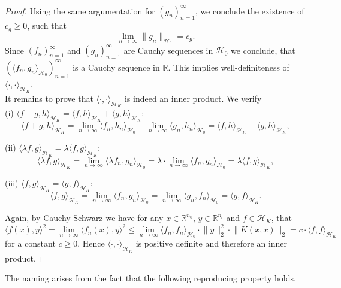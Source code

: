 \documentclass[11pt, a4paper]{article}
\newcommand{\N}{\mathbb{N}}
\newcommand{\R}{\mathbb{R}}
\renewcommand{\H}{\mathcal{H}}
\begin{document}
\begin{proof}
Using the same argumentation for $(g_n)_{n=1}^\infty$, we conclude the existence of $c_g \geq 0$, such that 
\[ \lim_{n \to \infty} \| g_n \big \|_{\H_0} = c_g. \] 
Since $(f_n)_{n=1}^\infty$ and $(g_n)_{n=1}^\infty$ are Cauchy sequences in $\H_0$ we conclude, that $(\langle f_n, g_n \rangle_{\H_0})_{n=1}^\infty$ is a Cauchy sequence in $\R$. This implies well-definiteness of $\langle \cdot, \cdot \rangle_{\H_K}$. \\

It remains to prove that $\langle \cdot, \cdot \rangle_{\H_K}$ is indeed an inner product. We verify \\

(i) $\langle f + g , h \rangle_{\H_K} = \langle f , h \rangle_{\H_K} + \langle g , h \rangle_{\H_K}$:
\[ \langle f + g , h \rangle_{\H_K} = \lim_{n \to \infty} \langle f_n , h_n \rangle_{\H_0} + \lim_{n \to \infty} \langle g_n , h_n \rangle_{\H_0} = \langle f , h \rangle_{\H_K} + \langle g , h \rangle_{\H_K}, \]

(ii) $\langle \lambda f , g \rangle_{\H_K} = \lambda \langle f, g \rangle_{\H_K}$:
\[ \langle \lambda f , g \rangle_{\H_K} = \lim_{n \to \infty} \langle \lambda f_n, g_n \rangle_{\H_0} = \lambda \cdot \lim_{n \to \infty} \langle f_n, g_n \rangle_{\H_0} = \lambda \langle f, g \rangle_{\H_K},  \]

(iii) $\langle f , g \rangle_{\H_K} = \langle g , f \rangle_{\H_K}$:
\[ \langle f , g \rangle_{\H_K} = \lim_{n \to \infty} \langle f_n, g_n \rangle_{\H_0} = \lim_{n \to \infty} \langle g_n, f_n \rangle_{\H_0} = \langle g , f \rangle_{\H_K}. \]

Again, by Cauchy-Schwarz we have for any $x \in \R^{n_0}$, $y \in \R^{n_l}$ and $f \in \H_K$, that
\[ \big \langle f(x), y \big \rangle^2 = \lim_{n \to \infty}  \big \langle f_n(x), y \big \rangle^2 \leq \lim_{n \to \infty} \big \langle f_n , f_n \big \rangle_{\H_0} \cdot \big \| y \big \|_2^2 \cdot \big \| K(x,x) \big \|_2 = c \cdot \big \langle f , f \big \rangle_{\H_K} \]
for a constant $c \geq 0$. Hence $\langle \cdot, \cdot \rangle_{\H_K}$ is positive definite and therefore an inner product.
\end{proof}

The naming arises from the fact that the following reproducing property holds.
\end{document}
